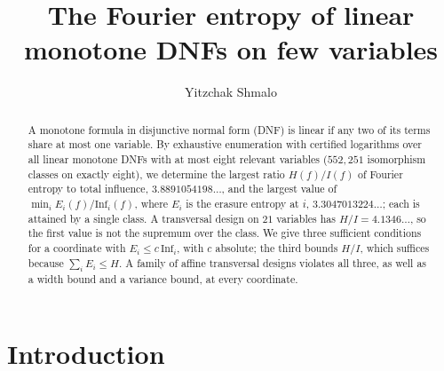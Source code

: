 \documentclass[11pt]{amsart}
\title{The Fourier entropy of linear monotone DNFs on few variables}
\author{Yitzchak Shmalo}
\date{}
\theoremstyle{remark}
\newcommand{\Inf}{\mathrm{Inf}}
\begin{document}
\begin{abstract}
A monotone formula in disjunctive normal form (DNF) is linear if any two of its terms share at most one variable. By
exhaustive enumeration with certified logarithms over all linear monotone DNFs with at most eight relevant variables
($552{,}251$ isomorphism classes on exactly eight), we determine the largest ratio $H(f)/I(f)$ of Fourier entropy to
total influence, $3.8891054198\ldots$, and the largest value of $\min_iE_i(f)/\Inf_i(f)$, where $E_i$ is the erasure
entropy at $i$, $3.3047013224\ldots$; each is attained by a single class. A transversal design on $21$ variables has
$H/I=4.1346\ldots$, so the first value is not the supremum over the class. We give three sufficient conditions for a
coordinate with $E_i\le c\,\Inf_i$, with $c$ absolute; the third bounds $H/I$, which suffices because $\sum_iE_i\le H$. A family of affine transversal designs violates
all three, as well as a width bound and a variance bound, at every coordinate.
\end{abstract}


\maketitle

\section{Introduction}\label{sec:intro}
\end{document}
